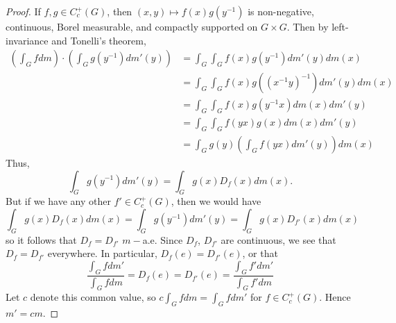\documentclass[11pt, a4paper]{memoir}
\theoremstyle{change}
\theoremstyle{plain}
\theoremstyle{nonumberplain}
\newtheorem{proof}{Proof}
\numberwithin{equation}{section}
\begin{document}
\begin{proof}
    If $f,g\in C_c^+(G)$, then $(x,y)\mapsto f(x)g(y^{-1})$ is non-negative, continuous, Borel measurable, and compactly supported on $G\times G$.
    Then by left-invariance and Tonelli's theorem,
    \begin{align*}
        \left(\int_Gfdm\right)\cdot\left(\int_G g(y^{-1})dm'(y)\right) &= \int_G\int_Gf(x)g(y^{-1})dm'(y)dm(x)\\
                                                                       &= \int_G\int_G f(x)g((x^{-1}y)^{-1})dm'(y)dm(x)\\
                                                                       &= \int_G\int_G f(x)g(y^{-1}x)dm(x)dm'(y)\\
                                                                       &= \int_G\int_G f(yx)g(x)dm(x)dm'(y)\\
                                                                       &= \int_Gg(y)\left(\int_G f(yx)dm'(y)\right)dm(x)
    \end{align*}
    Thus,
    \begin{equation*}
        \int_Gg(y^{-1})dm'(y) = \int_G g(x)D_f(x)dm(x).
    \end{equation*}
    But if we have any other $f'\in C_c^+(G)$, then we would have
    \begin{equation*}
        \int_Gg(x)D_f(x)dm(x)=\int_Gg(y^{-1})dm'(y)=\int_Gg(x)D_{f'}(x)dm(x)
    \end{equation*}
    so it follows that $D_f=D_{f'}$ $m-$a.e.
    Since $D_f$, $D_{f'}$ are continuous, we see that $D_f=D_{f'}$ everywhere.
    In particular, $D_f(e)=D_{f'}(e)$, or that
    \begin{equation*}
        \frac{\int_G fdm'}{\int_G fdm}=D_f(e)=D_{f'}(e)=\frac{\int_G f'dm'}{\int_G f'dm}
    \end{equation*}
    Let $c$ denote this common value, so $c\int_G fdm=\int_G fdm'$ for $f\in C_c^+(G)$.
    Hence $m'=cm$.
\end{proof}
\end{document}
